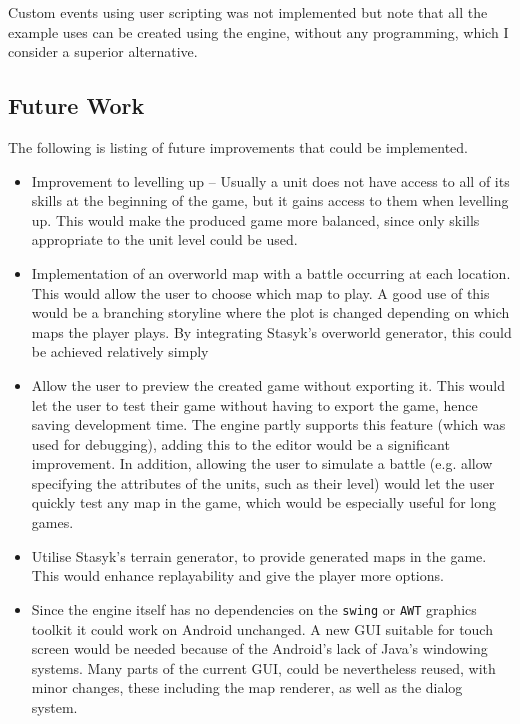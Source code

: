 Custom events using user scripting was not implemented but note that all the example uses can be created using the engine, without any programming, which I consider a superior alternative. 

\subsection{Future Work}

The following is listing of future improvements that could be implemented. 

\begin{itemize}
\item Improvement to levelling up -- Usually a unit does not have access to all of its skills at the beginning of the game, but it gains access to them when levelling up.  This would make the produced game  more balanced, since only skills appropriate to the unit level could be used.

\item Implementation of an overworld map with a battle occurring at each location. This would allow the user to choose which map to play.  A good use of this would be a branching storyline where the plot is changed depending on which maps the player plays. By integrating Stasyk's overworld generator, this could be achieved relatively simply
 
\item  Allow the user to preview the created game without exporting it.  This would let the user to test their game without having to export the game, hence saving development time.  The engine partly supports this feature (which was used for debugging), adding this to the editor would be a significant improvement. In addition, allowing the user to simulate a battle (e.g. allow specifying the attributes of the units, such as their level)  would let the user quickly test any map in the game, which would be especially useful for long games.

\item Utilise Stasyk's terrain generator, to provide generated maps in the game. This would enhance replayability and give the player more options. 

\item Since the engine itself has no dependencies on the \texttt{swing} or \texttt{AWT} graphics toolkit it could work on Android unchanged. A new GUI suitable for touch screen would be needed because of the Android's lack of  Java's windowing systems. Many parts of the current GUI, could be nevertheless reused, with minor changes, these including the map renderer, as well as the dialog system. 

\end{itemize}

